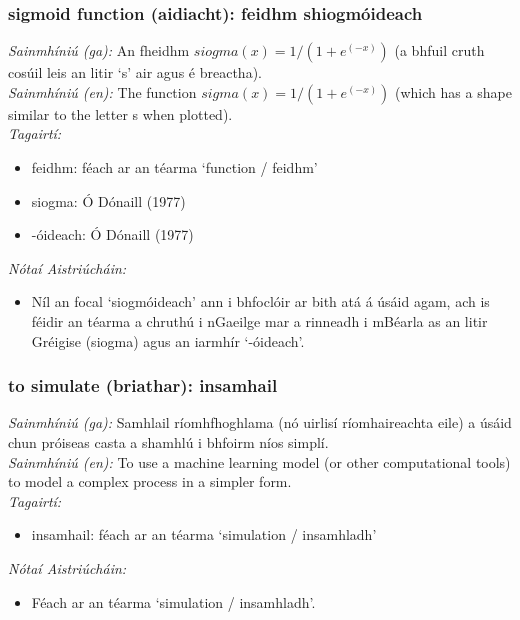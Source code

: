 \subsubsection*{sigmoid function (aidiacht): feidhm shiogmóideach}
 \noindent \textit{Sainmhíniú (ga):} An fheidhm $siogma(x) = 1 / (1 + e^(-x))$ (a bhfuil cruth cosúil leis an litir `s' air agus é breactha).
\\
 \noindent \textit{Sainmhíniú (en):} The function $sigma(x) = 1 / (1 + e^(-x))$ (which has a shape similar to the letter s when plotted).
\\
 \noindent \textit{Tagairtí:}
\begin{itemize}
	\item feidhm: féach ar an téarma `function / feidhm'
	\item siogma: Ó Dónaill (1977) \cite{odonaill}
	\item -óideach: Ó Dónaill (1977) \cite{odonaill}
\end{itemize}

 \noindent \textit{Nótaí Aistriúcháin:}
\begin{itemize}
	\item Níl an focal `siogmóideach' ann i bhfoclóir ar bith atá á úsáid agam, ach is féidir an téarma a chruthú i nGaeilge mar a rinneadh i mBéarla as an litir Gréigise (siogma) agus an iarmhír `-óideach'.
\end{itemize}


\subsubsection*{to simulate (briathar): insamhail}
 \noindent \textit{Sainmhíniú (ga):} Samhlail ríomhfhoghlama (nó uirlisí ríomhaireachta eile) a úsáid chun próiseas casta a shamhlú i bhfoirm níos simplí.
\\
 \noindent \textit{Sainmhíniú (en):} To use a machine learning model (or other computational tools) to model a complex process in a simpler form.
\\
 \noindent \textit{Tagairtí:}
\begin{itemize}
	\item insamhail: féach ar an téarma `simulation / insamhladh'
\end{itemize}

 \noindent \textit{Nótaí Aistriúcháin:}
\begin{itemize}
	\item Féach ar an téarma `simulation / insamhladh'.
\end{itemize}


